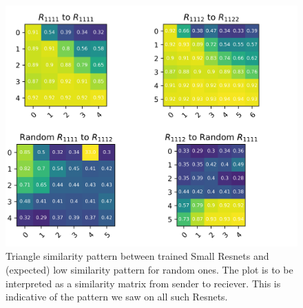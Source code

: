 \documentclass{article}
\begin{document}
\begin{center}
   \begin{figure}[H]
      \centering
      \includegraphics{tables.png}
      \caption{Triangle similarity pattern between trained Small Resnets and (expected) low similarity pattern for
      random ones. The plot is to be interpreted as a similarity matrix from sender to reciever. This is indicative
      of the pattern we saw on all such Resnets.}
   \end{figure}
\end{center}
\end{document}
